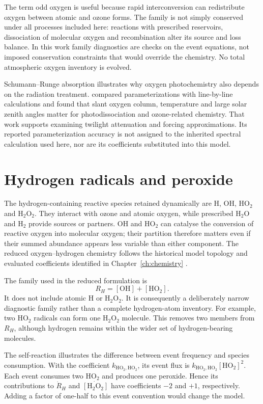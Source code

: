 The term odd oxygen is useful because rapid interconversion can redistribute oxygen between atomic and ozone forms. The family is not simply conserved under all processes included here: reactions with prescribed reservoirs, dissociation of molecular oxygen and recombination alter its source and loss balance. In this work family diagnostics are checks on the event equations, not imposed conservation constraints that would override the chemistry. No total atmospheric oxygen inventory is evolved.

Schumann--Runge absorption illustrates why oxygen photochemistry also depends on the radiation treatment. \citet{koppers1996} compared parameterizations with line-by-line calculations and found that slant oxygen column, temperature and large solar zenith angles matter for photodissociation and ozone-related chemistry. That work supports examining twilight attenuation and forcing approximations. Its reported parameterization accuracy is not assigned to the inherited spectral calculation used here, nor are its coefficients substituted into this model.

\section{Hydrogen radicals and peroxide}
The hydrogen-containing reactive species retained dynamically are H, OH, HO$_2$ and H$_2$O$_2$. They interact with ozone and atomic oxygen, while prescribed H$_2$O and H$_2$ provide sources or partners. OH and HO$_2$ can catalyse the conversion of reactive oxygen into molecular oxygen; their partition therefore matters even if their summed abundance appears less variable than either component. The reduced oxygen--hydrogen chemistry follows the historical model topology and evaluated coefficients identified in Chapter~\ref{ch:chemistry} \citep{li2020,jpl18}.

The family used in the reduced formulation is
\begin{equation}R_H=[\mathrm{OH}]+[\mathrm{HO}_2].\label{eq:rhdef}\end{equation}
It does not include atomic H or H$_2$O$_2$. It is consequently a deliberately narrow diagnostic family rather than a complete hydrogen-atom inventory. For example, two HO$_2$ radicals can form one H$_2$O$_2$ molecule. This removes two members from $R_H$, although hydrogen remains within the wider set of hydrogen-bearing molecules.

The self-reaction illustrates the difference between event frequency and species consumption. With the coefficient $k_{\mathrm{HO_2,HO_2}}$, its event flux is $k_{\mathrm{HO_2,HO_2}}[\mathrm{HO_2}]^2$. Each event consumes two HO$_2$ and produces one peroxide. Hence its contributions to $\dot R_H$ and $\dot{[\mathrm{H_2O_2}]}$ have coefficients $-2$ and $+1$, respectively. Adding a factor of one-half to this event convention would change the model.

